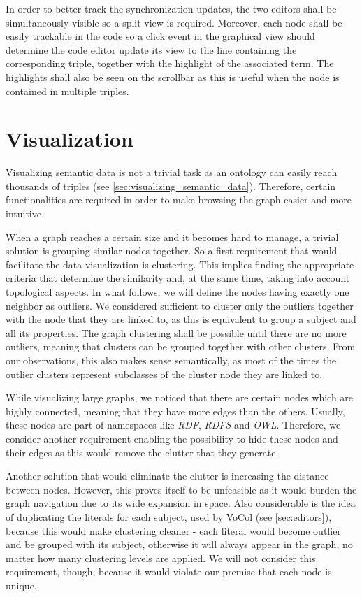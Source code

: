 In order to better track the synchronization updates, the two editors shall be simultaneously visible so a split view is required. Moreover, each node shall be easily trackable in the code so a click event in the graphical view should determine the code editor update its view to the line containing the corresponding triple, together with the highlight of the associated term. The highlights shall also be seen on the scrollbar as this is useful when the node is contained in multiple triples.


\section {Visualization}

Visualizing semantic data is not a trivial task as an ontology can easily reach thousands of triples (see \autoref{sec:visualizing_semantic_data}). Therefore, certain functionalities are required in order to make browsing the graph easier and more intuitive.

When a graph reaches a certain size and it becomes hard to manage, a trivial solution is grouping similar nodes together. So a first requirement that would facilitate the data visualization is clustering. This implies finding the appropriate criteria that determine the similarity and, at the same time, taking into account topological aspects. In what follows, we will define the nodes having exactly one neighbor as outliers. We considered sufficient to cluster only the outliers together with the node that they are linked to, as this is equivalent to group a subject and all its properties. The graph clustering shall be possible until there are no more outliers, meaning that clusters can be grouped together with other clusters. From our observations, this also makes sense semantically, as most of the times the outlier clusters represent subclasses of the cluster node they are linked to.

While visualizing large graphs, we noticed that there are certain nodes which are highly connected, meaning that they have more edges than the others. Usually, these nodes are part of namespaces like \textit{RDF}, \textit{RDFS} and \textit{OWL}. Therefore, we consider another requirement enabling the possibility to hide these nodes and their edges as this would remove the clutter that they generate.

Another solution that would eliminate the clutter is increasing the distance between nodes. However, this proves itself to be unfeasible as it would burden the graph navigation due to its wide expansion in space. Also considerable is the idea of duplicating the literals for each subject, used by VoCol (see \autoref{sec:editors}), because this would make clustering cleaner - each literal would become outlier and be grouped with its subject, otherwise it will always appear in the graph, no matter how many clustering levels are applied. We will not consider this requirement, though, because it would violate our premise that each node is unique.

